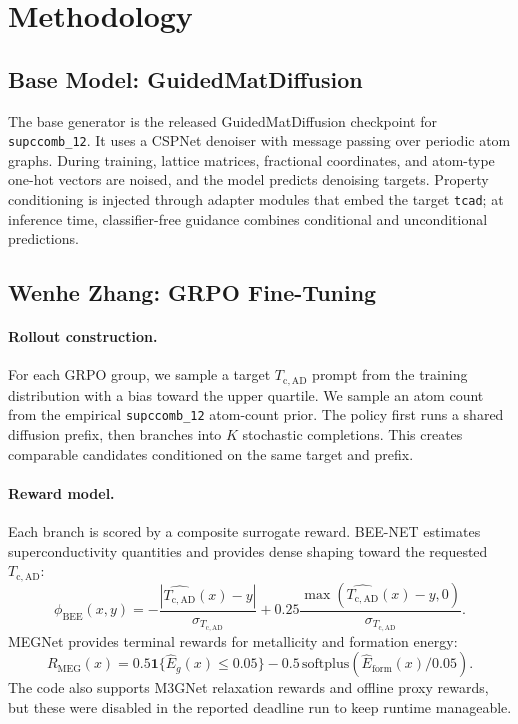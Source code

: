 \documentclass{article}
\newcommand{\Tcad}{T_{\mathrm{c,AD}}}
\begin{document}
\section{Methodology}
\subsection{Base Model: GuidedMatDiffusion}
The base generator is the released GuidedMatDiffusion checkpoint for \texttt{supccomb\_12}. It uses a CSPNet denoiser with message passing over periodic atom graphs. During training, lattice matrices, fractional coordinates, and atom-type one-hot vectors are noised, and the model predicts denoising targets. Property conditioning is injected through adapter modules that embed the target \texttt{tcad}; at inference time, classifier-free guidance combines conditional and unconditional predictions.

\subsection{Wenhe Zhang: GRPO Fine-Tuning}
\paragraph{Rollout construction.}
For each GRPO group, we sample a target $\Tcad$ prompt from the training distribution with a bias toward the upper quartile. We sample an atom count from the empirical \texttt{supccomb\_12} atom-count prior. The policy first runs a shared diffusion prefix, then branches into $K$ stochastic completions. This creates comparable candidates conditioned on the same target and prefix.

\paragraph{Reward model.}
Each branch is scored by a composite surrogate reward. BEE-NET estimates superconductivity quantities and provides dense shaping toward the requested $\Tcad$:
\begin{equation}
\phi_{\mathrm{BEE}}(x,y) =
-\frac{|\widehat{\Tcad}(x)-y|}{\sigma_{\Tcad}}
+0.25\frac{\max(\widehat{\Tcad}(x)-y,0)}{\sigma_{\Tcad}} .
\end{equation}
MEGNet provides terminal rewards for metallicity and formation energy:
\begin{equation}
R_{\mathrm{MEG}}(x)
=0.5\mathbf{1}\{\widehat{E}_g(x)\leq 0.05\}
-0.5\,\mathrm{softplus}\!\left(\widehat{E}_{\mathrm{form}}(x)/0.05\right).
\end{equation}
The code also supports M3GNet relaxation rewards and offline proxy rewards, but these were disabled in the reported deadline run to keep runtime manageable.
\end{document}

